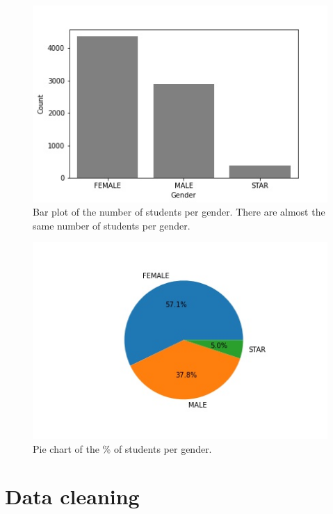\documentclass[sigplan,screen]{acmart}
\begin{document}
\begin{figure}
    \centering
    \includegraphics[width=\linewidth]{reports/figures/num_per_gender.jpg}
    \caption{Bar plot of the number of students per gender. There are almost the same number of students per gender.}
    \label{fig:gender}
\end{figure}

\begin{figure}
    \centering
    \includegraphics[width=\linewidth]{reports/figures/pie_chart.jpg}
    \caption{Pie chart of the \% of students per gender.}
    \label{fig:pie_chart}
\end{figure}

\section{Data cleaning} \label{data:cleaning}
\end{document}
